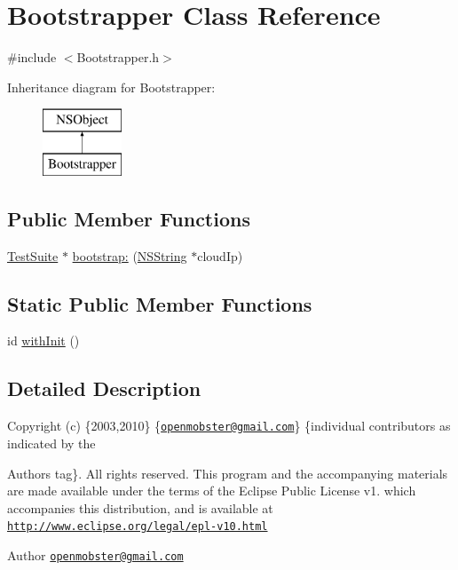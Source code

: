 \hypertarget{interface_bootstrapper}{
\section{\-Bootstrapper \-Class \-Reference}
\label{interface_bootstrapper}
}


{\ttfamily \#include $<$\-Bootstrapper.\-h$>$}

\-Inheritance diagram for \-Bootstrapper\-:\begin{figure}[H]
\begin{center}
\leavevmode
\includegraphics[height=2.000000cm]{interface_bootstrapper}
\end{center}
\end{figure}
\subsection*{\-Public \-Member \-Functions}
\begin{DoxyCompactItemize}
\item 
\hyperlink{interface_test_suite}{\-Test\-Suite} $\ast$ \hyperlink{interface_bootstrapper_a150721e26d50eb956298b54beccc8080}{bootstrap\-:} (\hyperlink{class_n_s_string}{\-N\-S\-String} $\ast$cloud\-Ip)
\end{DoxyCompactItemize}
\subsection*{\-Static \-Public \-Member \-Functions}
\begin{DoxyCompactItemize}
\item 
id \hyperlink{interface_bootstrapper_ac845b5e340119554ac5d53e5972a6e47}{with\-Init} ()
\end{DoxyCompactItemize}


\subsection{\-Detailed \-Description}
\-Copyright (c) \{2003,2010\} \{\href{mailto:openmobster@gmail.com}{\tt openmobster@gmail.\-com}\} \{individual contributors as indicated by the \begin{DoxyAuthor}{\-Authors}
tag\}. \-All rights reserved. \-This program and the accompanying materials are made available under the terms of the \-Eclipse \-Public \-License v1. which accompanies this distribution, and is available at \href{http://www.eclipse.org/legal/epl-v10.html}{\tt http\-://www.\-eclipse.\-org/legal/epl-\/v10.\-html}
\end{DoxyAuthor}
\begin{DoxyAuthor}{\-Author}
\href{mailto:openmobster@gmail.com}{\tt openmobster@gmail.\-com} 
\end{DoxyAuthor}


